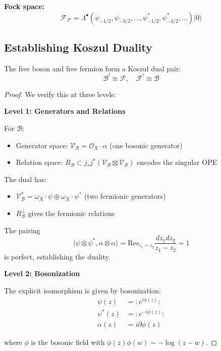 \textbf{Fock space:}
\[
\mathcal{F}_{\mathcal{F}} = \Lambda^{\bullet}(\psi_{-1/2}, \psi_{-3/2}, \ldots, \psi^*_{-1/2}, \psi^*_{-3/2}, \ldots) |0\rangle
\]

\subsection{Establishing Koszul Duality}

\begin{theorem}
The free boson and free fermion form a Koszul dual pair:
\[
\mathcal{B}^! \cong \mathcal{F}, \quad \mathcal{F}^! \cong \mathcal{B}
\]
\end{theorem}

\begin{proof}
We verify this at three levels:

\textbf{Level 1: Generators and Relations}

For $\mathcal{B}$:
\begin{itemize}
\item Generator space: $\mathcal{V}_{\mathcal{B}} = \mathcal{O}_X \cdot \alpha$ (one bosonic generator)
\item Relation space: $R_{\mathcal{B}} \subset j_*j^*(\mathcal{V}_{\mathcal{B}} \boxtimes \mathcal{V}_{\mathcal{B}})$ encodes the singular OPE
\end{itemize}

The dual has:
\begin{itemize}
\item $\mathcal{V}_{\mathcal{B}}^* = \omega_X \cdot \psi \oplus \omega_X \cdot \psi^*$ (two fermionic generators)
\item $R_{\mathcal{B}}^{\perp}$ gives the fermionic relations
\end{itemize}

The pairing 
\[
\langle \psi \otimes \psi^*, \alpha \otimes \alpha \rangle = \text{Res}_{z_1=z_2} \frac{dz_1 dz_2}{z_1-z_2} = 1
\]
is perfect, establishing the duality.

\textbf{Level 2: Bosonization}

The explicit isomorphism is given by bosonization:
\begin{align}
\psi(z) &= :e^{i\phi(z)}: \\
\psi^*(z) &= :e^{-i\phi(z)}: \\
\alpha(z) &= i\partial\phi(z)
\end{align}

where $\phi$ is the bosonic field with $\phi(z)\phi(w) \sim -\log(z-w)$.


\end{proof}
